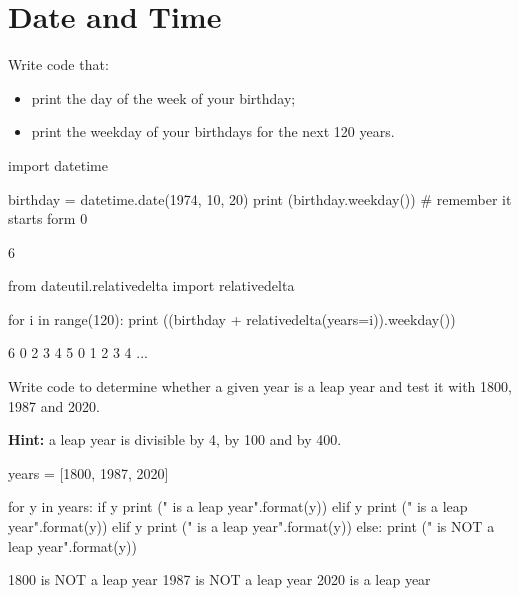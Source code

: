 \chapter{Date and Time}
\label{ex-datetime}

\begin{question}
Write code that:

\begin{itemize}
\item print the day of the week of your birthday;
\item print the weekday of your birthdays for the next 120 years.
\end{itemize}
\end{question}

\begin{solution}
\end{solution}	
\begin{ipython}
import datetime

birthday = datetime.date(1974, 10, 20)
print (birthday.weekday()) # remember it starts form 0

6

from dateutil.relativedelta import relativedelta

for i in range(120):
    print ((birthday + relativedelta(years=i)).weekday())

6
0
2
3
4
5
0
1
2
3
4
...
\end{ipython}

\begin{question}
Write code to determine whether a given year is a leap year and test it with 1800, 1987 and 2020.

\noindent\textbf{Hint:} a leap year is divisible by 4, by 100 and by 400.
\end{question}

\begin{solution}
\end{solution}

\begin{ipython}
years = [1800, 1987, 2020]

for y in years:
    if y %
        print ("{} is a leap year".format(y))
	elif y %
        print ("{} is a leap year".format(y)) 
    elif y %
        print ("{} is a leap year".format(y))
    else:
        print ("{} is NOT a leap year".format(y))

1800 is NOT a leap year
1987 is NOT a leap year
2020 is a leap year        
\end{ipython}  

